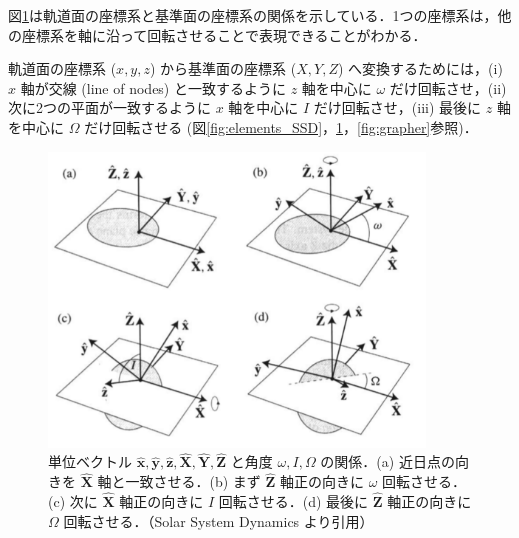 \documentclass[11pt,a4paper,oneside,onecolumn]{jreport}
\begin{document}
図\ref{fig:xyzXYZ}は軌道面の座標系と基準面の座標系の関係を示している．1つの座標系は，他の座標系を軸に沿って回転させることで表現できることがわかる．

軌道面の座標系 ($x, y, z$) から基準面の座標系 ($X, Y, Z$) へ変換するためには，(i) $x$ 軸が交線 (line of nodes) と一致するように $z$ 軸を中心に $\omega$ だけ回転させ，(ii) 次に2つの平面が一致するように $x$ 軸を中心に $I$ だけ回転させ，(iii) 最後に $z$ 軸を中心に $\Omega$ だけ回転させる (図\ref{fig:elements_SSD}，\ref{fig:xyzXYZ}，\ref{fig:grapher}参照)．

\begin{figure}[H]
\centering
\includegraphics[width=10cm]{./image/sec2_14.pdf}
\caption{単位ベクトル $\hat{\bm x}, \hat{\bm y}, \hat{\bm z}, \hat{\bm X}, \hat{\bm Y}, \hat{\bm Z}$ と角度 $\omega, I, \Omega$ の関係．(a) 近日点の向きを $\hat{\bm X}$ 軸と一致させる．(b) まず $\hat{\bm Z}$ 軸正の向きに $\omega$ 回転させる．(c) 次に $\hat{\bm X}$ 軸正の向きに $I$ 回転させる．(d) 最後に $\hat{\bm Z}$ 軸正の向きに $\Omega$ 回転させる．（Solar System Dynamics\cite{SSD} より引用）\label{fig:xyzXYZ}}
\end{figure}
\end{document}
